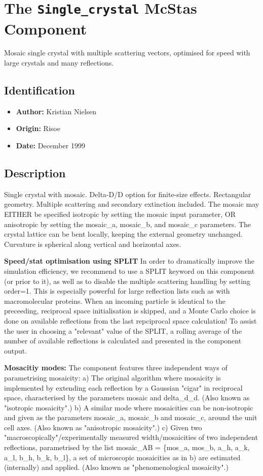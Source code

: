 \section{The \texttt{Single\_crystal} McStas Component}
Mosaic single crystal with multiple scattering vectors, optimised for speed
with large crystals and many reflections.

\subsection*{Identification}
\begin{itemize}
  \item \textbf{Author:} Kristian Nielsen
  \item \textbf{Origin:} Risoe
  \item \textbf{Date:} December 1999
\end{itemize}

\subsection*{Description}
Single crystal with mosaic. Delta-D/D option for finite-size effects. Rectangular geometry. Multiple scattering and secondary extinction included. The mosaic may EITHER be specified isotropic by setting the mosaic input parameter, OR anisotropic by setting the mosaic\_a, mosaic\_b, and mosaic\_c parameters. The crystal lattice can be bent locally, keeping the external geometry unchanged. Curvature is spherical along vertical and horizontal axes.

\textbf{Speed/stat optimisation using SPLIT} In order to dramatically improve the simulation efficiency, we recommend to use a SPLIT keyword on this component (or prior to it), as well as to disable the multiple scattering handling by setting order=1. This is especially powerful for large reflection lists such as with macromolecular proteins. When an incoming particle is identical to the preceeding, reciprocal space initialisation is skipped, and a Monte Carlo choice is done on available reflections from the last repciprocal space calculation! To assist the user in choosing a "relevant" value of the SPLIT, a rolling average of the number of available reflections is calculated and presented in the component output.

\textbf{Mosacitiy modes:} The component features three independent ways of parametrising mosaicity: a) The original algorithm where mosaicity is implemented by extending each reflection by a Gaussian "cigar" in reciprocal space, characterised by the parameters mosaic and delta\_d\_d. (Also known as "isotropic mosaicity".) b) A similar mode where mosaicities can be non-isotropic and given as the parameters mosaic\_a, mosaic\_b and mosaic\_c, around the unit cell axes. (Also known as "anisotropic mosaicity".) c) Given two "macroscopically"/experimentally measured width/mosaicities of two independent reflections, parametrised by the list mosaic\_AB = \{mos\_a, mos\_b, a\_h, a\_k, a\_l, b\_h, b\_k, b\_l\}, a set of microscopic mosaicities as in b) are estimated (internally) and applied. (Also known as "phenomenological mosaicity".)

